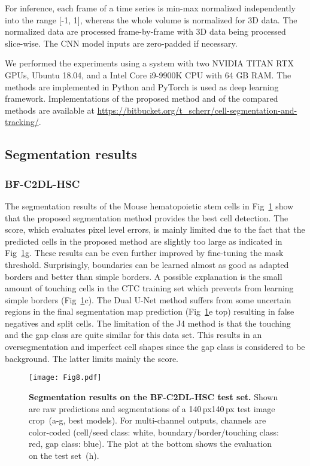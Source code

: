 \documentclass[10pt,letterpaper]{article}
\begin{document}
For inference, each frame of a time series is min-max normalized independently into the range [-1, 1], whereas the whole volume is normalized for 3D data. The normalized data are processed frame-by-frame with 3D data being processed slice-wise. The CNN model inputs are zero-padded if necessary.

We performed the experiments using a system with two NVIDIA TITAN RTX GPUs, Ubuntu 18.04, and a Intel Core i9-9900K CPU with 64 GB RAM. The methods are implemented in Python and PyTorch is used as deep learning framework. Implementations of the proposed method and of the compared methods are available at \href{https://bitbucket.org/t\_scherr/cell-segmentation-and-tracking/}{https://bitbucket.org/t\_scherr/cell-segmentation-and-tracking/}.

\subsection*{Segmentation results}
\subsubsection*{BF-C2DL-HSC}
The segmentation results of the Mouse hematopoietic stem cells in Fig~\ref{fig:bf-c2dl-hsc-results} show that the proposed segmentation method provides the best cell detection. The  score, which evaluates pixel level errors, is mainly limited due to the fact that the predicted cells in the proposed method are slightly too large as indicated in Fig~\ref{fig:bf-c2dl-hsc-results}g. These results can be even further improved by fine-tuning the mask threshold. Surprisingly, boundaries can be learned almost as good as adapted borders and better than simple borders. A possible explanation is the small amount of touching cells in the CTC training set which prevents from learning simple borders (Fig~\ref{fig:bf-c2dl-hsc-results}c). The Dual U-Net method suffers from some uncertain regions in the final segmentation map prediction (Fig~\ref{fig:bf-c2dl-hsc-results}e top) resulting in false negatives and split cells. The limitation of the J4 method is that the touching and the gap class are quite similar for this data set. This results in an oversegmentation and imperfect cell shapes since the gap class is considered to be background. The latter limits mainly the  score.
\begin{figure}
\begin{adjustwidth}{-2.25in}{0in}
\centering
\texttt{[image: Fig8.pdf]}
\caption{\textbf{Segmentation results on the BF-C2DL-HSC test set.} Shown are raw predictions and segmentations of a 140\,px140\,px test image crop~(a-g, best  models). For multi-channel outputs, channels are color-coded (cell/seed class: white, boundary/border/touching class: red, gap class: blue). The plot at the bottom shows the evaluation on the test set~(h).}
\label{fig:bf-c2dl-hsc-results}
\end{adjustwidth}
\end{figure}
\end{document}
